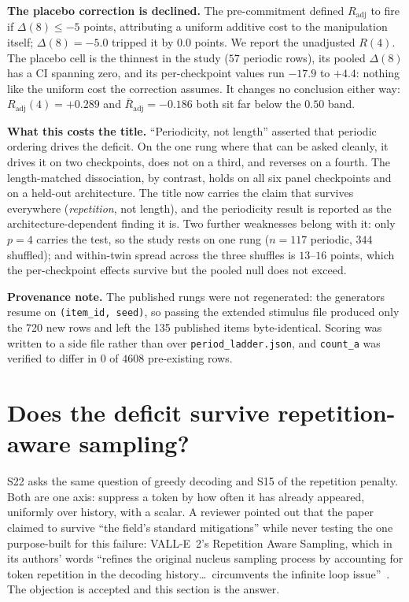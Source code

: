 \documentclass[11pt]{article}
\begin{document}
\textbf{The placebo correction is declined.} The pre-commitment defined
$R_{\text{adj}}$ to fire if $\Delta(8) \le -5$ points, attributing a uniform
additive cost to the manipulation itself; $\Delta(8) = -5.0$ tripped it by
$0.0$ points. We report the unadjusted $R(4)$. The placebo cell is the thinnest
in the study ($57$ periodic rows), its pooled $\Delta(8)$ has a CI spanning zero,
and its per-checkpoint values run $-17.9$ to $+4.4$: nothing like the uniform
cost the correction assumes. It changes no conclusion either way:
$R_{\text{adj}}(4) = +0.289$ and $\bar R_{\text{adj}} = -0.186$ both sit far
below the $0.50$ band.

\textbf{What this costs the title.} ``Periodicity, not length'' asserted that
periodic ordering drives the deficit. On the one rung where that can be asked
cleanly, it drives it on two checkpoints, does not on a third, and reverses on a
fourth. The length-matched dissociation, by contrast, holds on all six panel
checkpoints and on a held-out architecture. The title now carries the claim that
survives everywhere (\emph{repetition}, not length), and the periodicity
result is reported as the architecture-dependent finding it is. Two further
weaknesses belong with it: only $p{=}4$ carries the test, so the study rests on
one rung ($n{=}117$ periodic, $344$ shuffled); and within-twin spread across the
three shuffles is $13$--$16$ points, which the per-checkpoint effects survive but
the pooled null does not exceed.

\textbf{Provenance note.} The published rungs were not regenerated: the
generators resume on \texttt{(item\_id, seed)}, so passing the extended stimulus
file produced only the 720 new rows and left the 135 published items
byte-identical. Scoring was written to a side file rather than over
\texttt{period\_ladder.json}, and \texttt{count\_a} was verified to differ in
$0$ of $4608$ pre-existing rows.

\section{Does the deficit survive repetition-aware sampling?}
\label{sec:s29}

S22 asks the same question of greedy decoding and S15 of the repetition penalty.
Both are one axis: suppress a token by how often it has already appeared,
uniformly over history, with a scalar. A reviewer pointed out that the paper
claimed to survive ``the field's standard mitigations'' while never testing the
one purpose-built for this failure: VALL-E~2's Repetition Aware Sampling,
which in its authors' words ``refines the original nucleus sampling process by
accounting for token repetition in the decoding history\ldots\ circumvents the
infinite loop issue''~\cite{chen2024valle2}. The objection is accepted and this
section is the answer.
\end{document}
